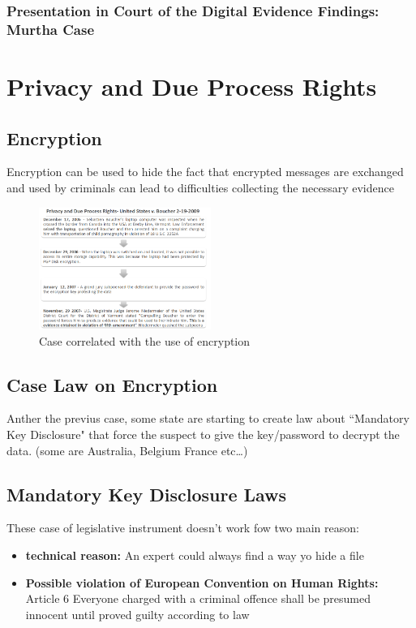 \subsubsection{Presentation in Court of the Digital Evidence Findings: Murtha Case}



\section{Privacy and Due Process Rights}

\subsection{Encryption}
Encryption can be used to hide the fact that encrypted messages are exchanged and used by criminals can lead to difficulties collecting the necessary evidence

\begin{figure}[!ht]
    \centering
    \includegraphics[width=0.5\textwidth]{img/enc_case.png}
    \caption{Case correlated with the use of encryption}
    \label{fig:encryption process}
\end{figure}

\newpage
\subsection{Case Law on Encryption}
Anther the previus case, some state are starting to create law about “Mandatory Key Disclosure" that force the suspect to give the key/password to decrypt the data. (some are Australia, Belgium France etc\dots) 

\subsection{Mandatory Key Disclosure Laws}
These case of legislative instrument doesn't work fow two main reason:
\begin{itemize}
    \item \textbf{technical reason:} An expert could always find a way yo hide a file
    \item \textbf{Possible violation of European Convention on Human Rights:} Article 6 Everyone charged with a criminal offence shall be presumed innocent until proved guilty according to law
\end{itemize} 

